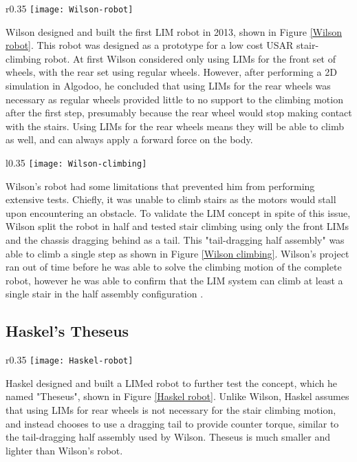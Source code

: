 \begin{wrapfigure}{r}{0.35\textwidth}
	\centering
	\texttt{[image: Wilson-robot]}
	\caption{Wilson's Robot \citep{Wilson-2013}.}
	\label{Wilson robot}
\end{wrapfigure}

Wilson designed and built the first LIM robot in 2013, shown in Figure \ref{Wilson robot}. This robot was designed as a prototype for a low cost USAR stair-climbing robot. At first Wilson considered only using LIMs for the front set of wheels, with the rear set using regular wheels. However, after performing a 2D simulation in Algodoo, he concluded that using LIMs for the rear wheels was necessary as regular wheels provided little to no support to the climbing motion after the first step, presumably because the rear wheel would stop making contact with the stairs. Using LIMs for the rear wheels means they will be able to climb as well, and can always apply a forward force on the body.



\begin{wrapfigure}{l}{0.35\textwidth}
	\centering
	\texttt{[image: Wilson-climbing]}
	\caption{Wilson's half assembly climbing a stair \citep{Wilson-2013}.}
	\label{Wilson climbing}
\end{wrapfigure}

Wilson's robot had some limitations that prevented him from performing extensive tests. Chiefly, it was unable to climb stairs as the motors would stall upon encountering an obstacle. To validate the LIM concept in spite of this issue, Wilson split the robot in half and tested stair climbing using only the front LIMs and the chassis dragging behind as a tail. This "tail-dragging half assembly" was able to climb a single step as shown in Figure \ref{Wilson climbing}. Wilson's project ran out of time before he was able to solve the climbing motion of the complete robot, however he was able to confirm that the LIM system can climb at least a single stair in the half assembly configuration \citep{Wilson-2013}.

\subsection{Haskel's Theseus} %

\begin{wrapfigure}{r}{0.35\textwidth}
	\centering
	\texttt{[image: Haskel-robot]}
	\caption{Haskel's Theseus \citep{Haskel-2017}.}
	\label{Haskel robot}
\end{wrapfigure}
Haskel designed and built a LIMed robot to further test the concept, which he named "Theseus", shown in Figure \ref{Haskel robot}. Unlike Wilson, Haskel assumes that using LIMs for rear wheels is not necessary for the stair climbing motion, and instead chooses to use a dragging tail to provide counter torque, similar to the tail-dragging half assembly used by Wilson. Theseus is much smaller and lighter than Wilson's robot.\\

